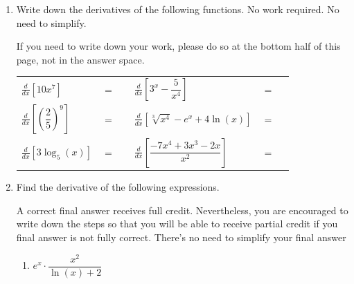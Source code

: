 \documentclass[11pt]{article}
\begin{document}
\begin{enumerate}
\item Write down the derivatives of the following functions. No work required. No need to simplify.

If you need to write down your work, please do so at the bottom half of this page, not in the answer space.

\begin{center}
        \begin{tabular}{l c r l c r}
            $\displaystyle\frac{d}{dx}\left[ 10x^7 \right]$ & $=$ & \rule[-8pt]{1.5in}{0.4pt} &
            $\displaystyle\frac{d}{dx}\left[ 3^x-\dfrac{5}{x^4} \right]$ & $=$ & \rule[-8pt]{1.5in}{0.4pt}\\[0.3in]
            $\displaystyle\frac{d}{dx}\left[ \left(\dfrac{2}{5}\right)^9 \right]$ & $=$ & \rule[-8pt]{1.5in}{0.4pt} & 
            $\displaystyle\frac{d}{dx}\left[ \sqrt[3]{x^4}-e^x+4\ln(x)\right]$ & $=$ & \rule[-8pt]{1.5in}{0.4pt}\\[0.3in]
            $\displaystyle\frac{d}{dx}\left[ 3\log_5(x) \right]$ & $=$ & \rule[-8pt]{1.5in}{0.4pt}&
            $\displaystyle\frac{d}{dx}\left[ \dfrac{-7x^4+3x^3-2x}{x^2} \right]$ & $=$ & \rule[-8pt]{1.5in}{0.4pt}\\[0.3in]
        \end{tabular} 
\end{center}


\newpage


\item Find the derivative of the following expressions. 

A correct final answer receives full credit. Nevertheless, you are encouraged to write down the steps so that you will be able to receive partial credit if you final answer is not fully correct. There's no need to simplify your final answer

\begin{enumerate}
\item $e^x\cdot\dfrac{x^2}{\ln(x)+2}$

\vfill


\end{enumerate}
\end{enumerate}
\end{document}
